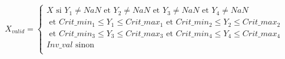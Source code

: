 \[
X_{valid} = 
\begin{cases}
X \text{ si } Y_{1} \ne NaN \text{ et } Y_{2} \ne NaN \text{ et } Y_{3} \ne NaN \text{ et } Y_{4} \ne NaN \\
 \text{ et } Crit\_{min_1} \le Y_{1} \le Crit\_{max_1} \text{ et } Crit\_{min_2} \le Y_{2} \le Crit\_{max_2} \\
 \text{ et } Crit\_{min_3} \le Y_{3} \le Crit\_{max_3} \text{ et } Crit\_{min_4} \le Y_{4} \le Crit\_{max_4}\\
Inv\_val \text{ sinon}\\
\end{cases}
\]

